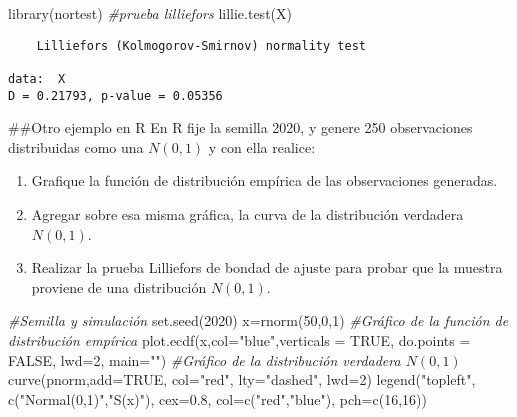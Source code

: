 \documentclass[
  a4paper,
  oneside,
  openany]{book}
\newenvironment{Shaded}{\begin{snugshade}}{\end{snugshade}}
\newcommand{\AttributeTok}[1]{\textcolor[rgb]{0.77,0.63,0.00}{#1}}
\newcommand{\CommentTok}[1]{\textcolor[rgb]{0.56,0.35,0.01}{\textit{#1}}}
\newcommand{\ConstantTok}[1]{\textcolor[rgb]{0.00,0.00,0.00}{#1}}
\newcommand{\DecValTok}[1]{\textcolor[rgb]{0.00,0.00,0.81}{#1}}
\newcommand{\FloatTok}[1]{\textcolor[rgb]{0.00,0.00,0.81}{#1}}
\newcommand{\FunctionTok}[1]{\textcolor[rgb]{0.00,0.00,0.00}{#1}}
\newcommand{\NormalTok}[1]{#1}
\newcommand{\OtherTok}[1]{\textcolor[rgb]{0.56,0.35,0.01}{#1}}
\newcommand{\StringTok}[1]{\textcolor[rgb]{0.31,0.60,0.02}{#1}}
\begin{document}
\begin{Shaded}
\begin{Highlighting}[]
\FunctionTok{library}\NormalTok{(nortest) }\CommentTok{\#prueba lilliefors}
\FunctionTok{lillie.test}\NormalTok{(X)}
\end{Highlighting}
\end{Shaded}

\begin{verbatim}
    Lilliefors (Kolmogorov-Smirnov) normality test

data:  X
D = 0.21793, p-value = 0.05356
\end{verbatim}

\#\#Otro ejemplo en R
En R fije la semilla 2020, y genere 250 observaciones distribuidas como una \(N(0, 1)\) y con ella realice:

\begin{enumerate}
\item Grafique la función de distribución empírica de las observaciones generadas.
\item Agregar sobre esa misma gráfica, la curva de la distribución verdadera $N(0,1)$. 
\item Realizar la prueba Lilliefors de bondad de ajuste para probar que la muestra proviene de una distribución $N(0,1)$.
\end{enumerate}

\begin{Shaded}
\begin{Highlighting}[]
\CommentTok{\#Semilla y simulación}
\FunctionTok{set.seed}\NormalTok{(}\DecValTok{2020}\NormalTok{)}
\NormalTok{x}\OtherTok{=}\FunctionTok{rnorm}\NormalTok{(}\DecValTok{50}\NormalTok{,}\DecValTok{0}\NormalTok{,}\DecValTok{1}\NormalTok{)}
\CommentTok{\#Gráfico de la función de distribución empírica}
\FunctionTok{plot.ecdf}\NormalTok{(x,}\AttributeTok{col=}\StringTok{"blue"}\NormalTok{,}\AttributeTok{verticals =} \ConstantTok{TRUE}\NormalTok{, }\AttributeTok{do.points =} \ConstantTok{FALSE}\NormalTok{, }\AttributeTok{lwd=}\DecValTok{2}\NormalTok{, }\AttributeTok{main=}\StringTok{""}\NormalTok{)}
\CommentTok{\#Gráfico de la distribución verdadera $N(0,1)$}
\FunctionTok{curve}\NormalTok{(pnorm,}\AttributeTok{add=}\ConstantTok{TRUE}\NormalTok{, }\AttributeTok{col=}\StringTok{"red"}\NormalTok{, }\AttributeTok{lty=}\StringTok{"dashed"}\NormalTok{, }\AttributeTok{lwd=}\DecValTok{2}\NormalTok{)}
\FunctionTok{legend}\NormalTok{(}\StringTok{"topleft"}\NormalTok{, }\FunctionTok{c}\NormalTok{(}\StringTok{"Normal(0,1)"}\NormalTok{,}\StringTok{"S(x)"}\NormalTok{), }\AttributeTok{cex=}\FloatTok{0.8}\NormalTok{, }\AttributeTok{col=}\FunctionTok{c}\NormalTok{(}\StringTok{"red"}\NormalTok{,}\StringTok{"blue"}\NormalTok{), }\AttributeTok{pch=}\FunctionTok{c}\NormalTok{(}\DecValTok{16}\NormalTok{,}\DecValTok{16}\NormalTok{))}
\end{Highlighting}
\end{Shaded}
\end{document}
